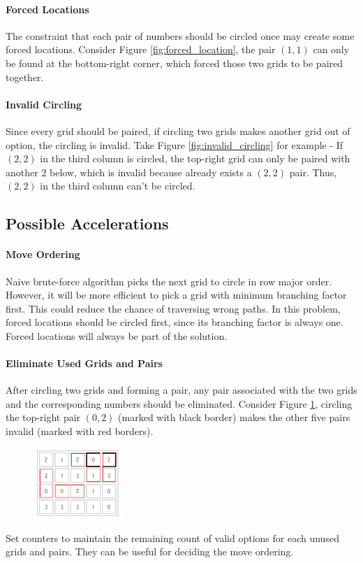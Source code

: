 \documentclass[12pt]{article}
\begin{document}
\paragraph*{Forced Locations}
The constraint that each pair of numbers should be circled once may create some forced locations. Consider Figure \ref{fig:forced_location}, the pair $(1,1)$ can only be found at the bottom-right corner, which forced those two grids to be paired together.
	
\paragraph*{Invalid Circling}
Since every grid should be paired, if circling two grids makes another grid out of option, the circling is invalid. Take Figure \ref{fig:invalid_circling} for example - If $(2,2)$ in the third column is circled, the top-right grid can only be paired with another $2$ below, which is invalid because already exists a $(2,2)$ pair. Thus, $(2,2)$ in the third column can't be circled.

\subsection*{Possible Accelerations}
\paragraph*{Move Ordering}
Naive brute-force algorithm picks the next grid to circle in row major order. However, it will be more efficient to pick a grid with minimum branching factor first. This could reduce the chance of traversing wrong paths. In this problem, forced locations should be circled first, since its branching factor is always one. Forced locations will always be part of the solution.

\paragraph*{Eliminate Used Grids and Pairs}
After circling two grids and forming a pair, any pair associated with the two grids and the corresponding numbers should be eliminated. Consider Figure \ref{fig:eliminate}, circling the top-right pair $(0,2)$ (marked with black border) makes the other five pairs invalid (marked with red borders).
	\begin{figure}[H]
	\centering
	\includegraphics[width=0.3\textwidth]{fig_eliminate}
	\caption[Caption for the list of figures]{}
	\label{fig:eliminate}
	\end{figure}
Set counters to maintain the remaining count of valid options for each unused grids and pairs. They can be useful for deciding the move ordering.
\end{document}
